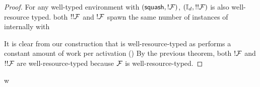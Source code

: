\begin{proof}
For any well-typed environment with $({\mathsf {squash}}, !\mathcal{F})$, $(\mathbb{I}_d, !!\mathcal{F})$ is also well-resource typed.
both $!!\mathcal{F}$ and $!\mathcal{F}$ spawn the same number of instances of \F internally with 


It is clear from our construction that  is well-resource-typed as performs a constant amount of work per activation ()
By the previous theorem, both $!\mathcal{F}$ and $!!\mathcal{F}$ are well-resource-typed because $\mathcal{F}$ is well-resource-typed.
\end{proof}


w


